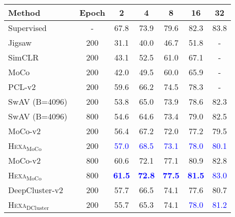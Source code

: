 \documentclass[10pt,twocolumn,letterpaper]{article}
\newcommand{\shortname}{\textsc{Hexa}}
\begin{document}
\begin{table}[t!]
\footnotesize \centering
\begin{tabular}{@{\hspace{-0pt}}l@{\hspace{8pt}}c@{\hspace{5pt}}|c@{\hspace{7pt}}c@{\hspace{7pt}}c@{\hspace{7pt}}c@{\hspace{7pt}}c }\toprule
 Method   & Epoch &  2  & 4 &  8 & 16 & 32\\ 
\hline
 Supervised~~ &  -  &  67.8 & 73.9 & 79.6 & 82.3 & 83.8  \\
\hline
Jigsaw~\cite{noroozi2016unsupervised} & 200 & 31.1 & 40.0 & 46.7 & 51.8 & - \\
SimCLR~\cite{chen2020simple} & 200 &   43.1 & 52.5 & 61.0 & 67.1 & - \\
MoCo~\cite{he2020momentum} & 200 &  42.0 & 49.5 & 60.0 & 65.9 &  -  \\        
PCL-v2~\cite{li2020prototypical} & 200 & 59.6  & 66.2 &  74.5  & 78.3 &  -\\
SwAV \!(B=4096)\!~\cite{caron2020unsupervised} & 200 & 53.8 & 65.0 & 73.9 &  78.6 &  82.3  \\
SwAV \!(B=4096)\!~\cite{caron2020unsupervised} & 800 & 54.6 & 64.6 & 73.4 &  79.0 &  82.5  \\
\hline
 MoCo-v2~\cite{chen2020improved} &  200  & 56.4  & 67.2  & 72.0  & 77.2 &  79.5 \\
\rowcolor{Gray}
\cellcolor{white}
   \shortname{}$_{\text{MoCo}}$  &  200   & \textcolor{blue}{57.0}   & \textcolor{blue}{68.5}   &  \textcolor{blue}{73.1}   & \textcolor{blue}{78.0}  & \textcolor{blue}{80.1}
  \\ \hline 
 MoCo-v2~\cite{chen2020improved} &  800  & 60.6 & 72.1 & 77.1 & 80.9 & 82.8 \\
\rowcolor{Gray}
\cellcolor{white}
   \shortname{}$_{\text{MoCo}}$  &  800   & \textcolor{blue}{\bf{61.5}}   & \textcolor{blue}{\bf{72.8}}   &  \textcolor{blue}{\bf{77.5}}   & \textcolor{blue}{\bf{81.5}}  & \textcolor{blue}{83.0}
  \\ \hline 
  DeepCluster-v2~\cite{caron2018deepcluster,caron2020unsupervised} &  200  &  
  57.7 &  66.5 & 74.1 & 77.6 & 80.7 \\  \rowcolor{Gray}
\cellcolor{white}
  \shortname{}$_{\text{DCluster}}$  & 200  & 55.7 & 65.3 & 74.1 & \textcolor{blue}{78.0} & \textcolor{blue}{81.2}\\

\end{tabular}
\end{table}
\end{document}
